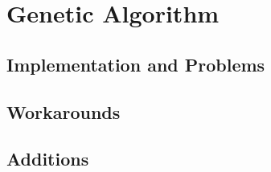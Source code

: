 \section{Genetic Algorithm}
\subsection{Implementation and Problems}
\subsection{Workarounds}
\subsection{Additions}
